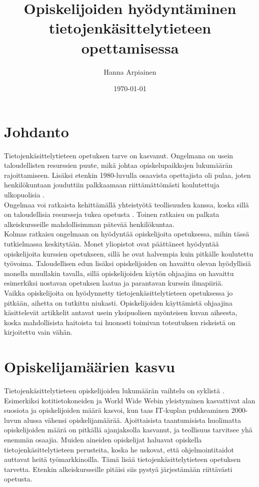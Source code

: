 \documentclass[finnish]{tktltiki2}
\title{﻿Opiskelijoiden hyödyntäminen tietojenkäsittelytieteen opettamisessa}
\author{Hanna Arpiainen}
\date{\today}
\theoremstyle{definition}
\theoremstyle{remark}
\begin{document}
\maketitle
\makeabstract

\tableofcontents
\newpage





\section{Johdanto}
Tietojenkäsittelytieteen opetuksen tarve on kasvanut. Ongelmana on usein taloudellisten resurssien puute, mikä johtaa opiskelupaikkojen lukumäärän rajoittamiseen. Lisäksi etenkin 1980-luvulla osaavista opettajista oli pulaa, joten henkilökuntaan jouduttiin palkkaamaan riittämättömästi koulutettuja ulkopuolisia \cite{Roberts11}. 
\\
Ongelmaa voi ratkaista kehittämällä yhteistyötä teollisuuden kanssa, koska sillä on taloudellisia resursseja tukea opetusta \cite{Roberts11}. Toinen ratkaisu on palkata alkeiskursseille mahdollisimman pätevää henkilökuntaa. 
\\
Kolmas ratkaisu ongelmaan on hyödyntää opiskelijoita opetuksessa, mihin tässä tutkielmassa keskitytään. Monet yliopistot ovat päättäneet hyödyntää opiskelijoita kurssien opetukseen, sillä he ovat halvempia kuin pitkälle koulutettu työvoima. Taloudellisen edun lisäksi opiskelijoiden on havaittu olevan hyödyllisiä monella muullakin tavalla, sillä opiskelijoiden käytön ohjaajina on havaittu esimerkiksi nostavan opetuksen laatua ja parantavan kurssin ilmapiiriä.
\\
Vaikka opiskelijoita on hyödynnetty tietojenkäsittelytieteen opetuksessa jo pitkään, aihetta on tutkittu niukasti. Opiskelijoiden käyttämistä ohjaajina käsittelevät artikkelit antavat usein yksipuolisen myönteisen kuvan aiheesta, koska mahdollisista haitoista tai huonosti toimivan toteutuksen riskeistä on kirjoitettu vain vähän. 


\section{Opiskelijamäärien kasvu}

Tietojenkäsittelytieteen opiskelijoiden lukumäärän vaihtelu on syklistä \cite{Roberts11}. Esimerkiksi kotitietokoneiden ja World Wide Webin yleistyminen kasvattivat alan suosiota ja opiskelijoiden määrä kasvoi, kun taas IT-kuplan puhkeaminen 2000-luvun alussa vähensi opiskelijamäärää. Ajoittaisista taantumisista huolimatta opiskelijoiden määrä on pitkällä ajanjaksolla kasvanut, ja teollisuus tarvitsee yhä enemmän osaajia. Muiden aineiden opiskelijat haluavat opiskella tietojenkäsittelytieteen perusteita, koska he uskovat, että ohjelmointitaidot auttavat heitä työmarkkinoilla. Tämä lisää tietojenkäsittelytieteen opetuksen tarvetta. Etenkin alkeiskursseille pitäisi siis pystyä järjestämään riittävästi opetusta. 
\end{document}
